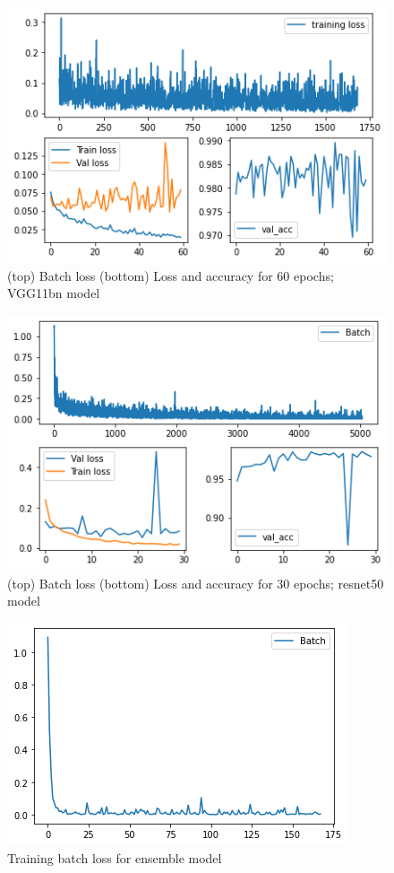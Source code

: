 \documentclass[11pt]{article}
\newcommand{\0}{{\mathbf{0}}}
\newcommand{\1}{{\mathbf{1}}}
\begin{document}
\begin{figure}[h]
      \includegraphics[width=.7\textwidth]{figures/vgg11bn_result.png}
      \centering
      \caption{(top) Batch loss (bottom) Loss and accuracy for 60 epochs; VGG11bn model}
      \label{fig:vggrslt}
\end{figure}

\begin{figure}[h]
      \includegraphics[width=.7\textwidth]{figures/res50result.png}
      \centering
      \caption{(top) Batch loss (bottom) Loss and accuracy for 30 epochs; resnet50 model}
      \label{fig:resrslt}
\end{figure}

\begin{figure}[h]
      \includegraphics[width=.5\textwidth]{figures/esb_batch.png}
      \centering
      \caption{Training batch loss for ensemble model}
      \label{fig:esbbatch}
\end{figure}
\end{document}
